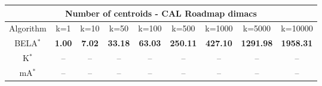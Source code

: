\begin{tabular}{c|cccccccc}\toprule
\multicolumn{9}{c}{Number of centroids - CAL Roadmap dimacs}\\ \midrule
Algorithm & k=1 & k=10 & k=50 & k=100 & k=500 & k=1000 & k=5000 & k=10000 \\ \midrule
BELA$^*$ & \textbf{1.00} & \textbf{7.02} & \textbf{33.18} & \textbf{63.03} & \textbf{250.11} & \textbf{427.10} & \textbf{1291.98} & \textbf{1958.31} \\
K$^*$ & -- & -- & -- & -- & -- & -- & -- & -- \\
mA$^*$ & -- & -- & -- & -- & -- & -- & -- & -- \\ \bottomrule 
\end{tabular}
